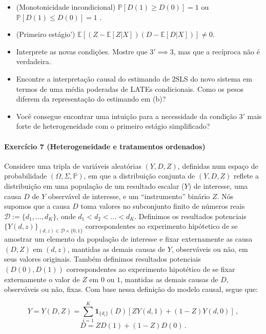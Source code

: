 \documentclass[10pt,a4paper]{article}
\begin{document}
\begin{itemize}
	\item[3'] (Monotonicidade incondicional) $\mathbb{P}[D(1)\geq D(0)] =1$ ou $\mathbb{P}[D(1)\leq D(0)] =1$ .
	\item[4'] (Primeiro estágio') $\mathbb{E}[(Z-\mathbb{E}[Z|X])(D-\mathbb{E}[D|X])] \neq 0$.
\end{itemize}

\begin{itemize}
	\item[c] Interprete as novas condições. Mostre que $3' \implies 3$, mas que a recíproca não é verdadeira.
	\item[d] Encontre a interpretação causal do estimando de 2SLS do novo sistema em termos de uma média poderadas de LATEs condicionais. Como os pesos diferem da representação do estimando em (b)?
	\item[\textbf{Bônus}] Você consegue encontrar uma intuição para a necessidade da condição $3'$ mais forte de heterogeneidade com o primeiro estágio simplificado?
\end{itemize}


\paragraph{Exercício 7 (Heterogeneidade e tratamentos ordenados)} Considere uma tripla de variáveis aleatórias $(Y,D,Z)$, definidas num espaço de probabilidade  $(\Omega, \Sigma,\mathbb{P})$, em que a distribuição conjunta de $(Y,D,Z)$ reflete a distribuição em uma população de um resultado escalar ($Y$) de interesse, uma causa  $D$ de $Y$ observável de interesse, e um ``instrumento'' binário $Z$. Nós supomos que a causa $D$ toma valores no subconjunto finito de números reais $\mathcal{D}:=\{d_1,\ldots, d_K\}$, onde $d_1 < d_2 < \ldots < d_K$. Definimos os resultados potenciais $\{Y(d,z)\}_{(d,z)\in \mathcal{D} \times \{0,1\} }$ correspondentes ao experimento hipótetico de se amostrar um elemento da população de interesse e fixar externamente as causa $(D,Z)$ em $(d,z)$, mantidas as demais causas de $Y$, observáveis ou não, em seus valores originais. Também definimos resultados potenciais $(D(0),D(1))$ correspondentes ao experimento hipotético de se fixar externamente o valor de $Z$ em $0$ ou $1$, mantidas as demais causas de $D$, observáveis ou não, fixas.
Com base nessa definição do modelo causal, segue que: 

$$Y = Y(D,Z) = \sum_{i=1}^K\mathbf{1}_{\{d_i\}}(D)[Z Y(d,1) + (1-Z)Y(d,0)]\, ,$$
$$D = ZD(1) + (1-Z)D(0)\, .$$
\end{document}
